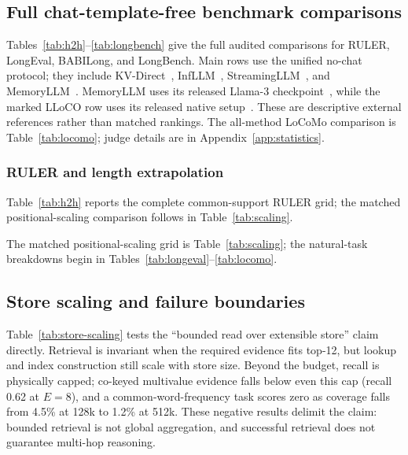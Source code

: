 \subsection{Full chat-template-free benchmark comparisons}
\label{app:tasks}
Tables~\ref{tab:h2h}--\ref{tab:longbench} give the full audited comparisons for
RULER, LongEval, BABILong, and LongBench. Main rows use the unified no-chat
protocol; they include KV-Direct~\citep{kvdirect}, InfLLM~\citep{infllm},
StreamingLLM~\citep{streamingllm}, and MemoryLLM~\citep{memoryllm}. MemoryLLM
uses its released Llama-3 checkpoint~\citep{llama3}, while the marked LLoCO
row uses its released native setup~\citep{lloco}. These are descriptive external
references rather than matched rankings.
The all-method LoCoMo comparison is Table~\ref{tab:locomo}; judge details are in
Appendix~\ref{app:statistics}.



\subsubsection{RULER and length extrapolation}
Table~\ref{tab:h2h} reports the complete common-support RULER grid; the
matched positional-scaling comparison follows in Table~\ref{tab:scaling}.

The matched positional-scaling grid is Table~\ref{tab:scaling}; the natural-task breakdowns begin in Tables~\ref{tab:longeval}--\ref{tab:locomo}.






\subsection{Store scaling and failure boundaries}
\label{app:scaling}
Table~\ref{tab:store-scaling} tests the ``bounded read over extensible store''
claim directly. Retrieval is invariant when the required evidence fits top-12,
but lookup and index construction still scale with store size. Beyond the budget,
recall is physically capped; co-keyed multivalue evidence falls below even this
cap (recall 0.62 at $E{=}8$), and a common-word-frequency task scores zero as
coverage falls from 4.5\% at 128k to 1.2\% at 512k. These negative results delimit
the claim: bounded retrieval is not global aggregation, and successful retrieval
does not guarantee multi-hop reasoning.



